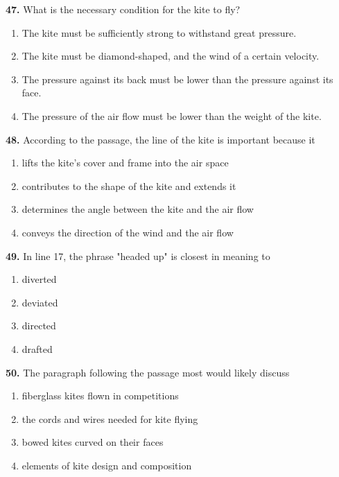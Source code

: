 \documentclass[12pt]{article}
\begin{document}
\par
\vspace{0.25\baselineskip}
\noindent\textbf{47.} What is the necessary condition for the kite to fly?
\begin{enumerate}[label=(\Alph*),leftmargin=*,itemsep=0.2em]
\item The kite must be sufficiently strong to withstand great pressure.
\item The kite must be diamond-shaped, and the wind of a certain velocity.
\item The pressure against its back must be lower than the pressure against its face.
\item The pressure of the air flow must be lower than the weight of the kite.
\end{enumerate}
\par
\vspace{0.25\baselineskip}
\noindent\textbf{48.} According to the passage, the line of the kite is important because it
\begin{enumerate}[label=(\Alph*),leftmargin=*,itemsep=0.2em]
\item lifts the kite's cover and frame into the air space
\item contributes to the shape of the kite and extends it
\item determines the angle between the kite and the air flow
\item conveys the direction of the wind and the air flow
\end{enumerate}
\par
\vspace{0.25\baselineskip}
\noindent\textbf{49.} In line 17, the phrase "headed up" is closest in meaning to
\begin{enumerate}[label=(\Alph*),leftmargin=*,itemsep=0.2em]
\item diverted
\item deviated
\item directed
\item drafted
\end{enumerate}
\par
\vspace{0.25\baselineskip}
\noindent\textbf{50.} The paragraph following the passage most would likely discuss
\begin{enumerate}[label=(\Alph*),leftmargin=*,itemsep=0.2em]
\item fiberglass kites flown in competitions
\item the cords and wires needed for kite flying
\item bowed kites curved on their faces
\item elements of kite design and composition
\end{enumerate}
\par
\vspace{0.25\baselineskip}
\end{document}
